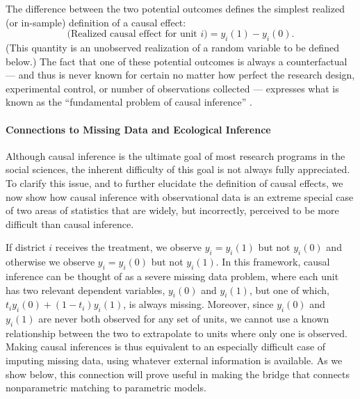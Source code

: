 \documentclass[11pt,titlepage]{article}
\begin{document}
The difference between the two potential outcomes defines the simplest
realized (or in-sample) definition of a causal effect:
\begin{equation}
  \label{rce}
  \text{(Realized causal effect for unit $i$)} = y_i(1) - y_i(0).
\end{equation}
(This quantity is an unobserved realization of a random variable to be
defined below.)  The fact that one of these potential outcomes is
always a counterfactual --- and thus is never known for certain no
matter how perfect the research design, experimental control, or
number of observations collected --- expresses what is known as the
``fundamental problem of causal inference'' \citep{Holland86}.

\paragraph{Connections to Missing Data and Ecological Inference}
Although causal inference is the ultimate goal of most research
programs in the social sciences, the inherent difficulty of this goal
is not always fully appreciated.  To clarify this issue, and to
further elucidate the definition of causal effects, we now show how
causal inference with observational data is an extreme special case of
two areas of statistics that are widely, but incorrectly, perceived to
be more difficult than causal inference.

If district $i$ receives the treatment, we observe $y_i=y_i(1)$ but
not $y_i(0)$ and otherwise we observe $y_i=y_i(0)$ but not $y_i(1)$.
In this framework, causal inference can be thought of as a severe
missing data problem, where each unit has two relevant dependent
variables, $y_i(0)$ and $y_i(1)$, but one of which, $t_iy_i(0) +
(1-t_i)y_i(1)$, is always missing.  Moreover, since $y_i(0)$ and
$y_i(1)$ are never both observed for any set of units, we cannot use a
known relationship between the two to extrapolate to units where only
one is observed.  Making causal inferences is thus equivalent to an
especially difficult case of imputing missing data, using whatever
external information is available.  As we show below, this connection
will prove useful in making the bridge that connects nonparametric
matching to parametric models.
\end{document}
